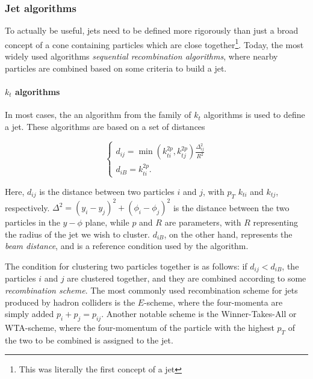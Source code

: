 \documentclass[10pt,a4paper]{book}
\begin{document}
\subsubsection{Jet algorithms}
To actually be useful, jets need to be defined more rigorously than just a broad concept of a cone containing particles which are close together\footnote{This was literally the first concept of a jet}. Today, the most widely used algorithms \emph{sequential recombination algorithms}, where nearby particles are combined based on some criteria to build a jet. 

\paragraph{$k_t$ algorithms}

In most cases, the an algorithm from the family of $k_t$ algorithms is used to define a jet. These algorithms are based on a set of distances

\begin{equation}
\begin{cases}
d_{ij} = \min(k_{ti}^{2p}, k_{tj}^{2p})\frac{\Delta_{ij}^2}{R^2} \\
d_{iB} = k_{ti}^{2p}.
\end{cases}
\end{equation}

Here, $d_{ij}$ is the distance between two particles $i$ and $j$, with $p_T$ $k_{ti}$ and $k_{tj}$, respectively. $\Delta^2 = (y_i - y_j)^2 + (\phi_i - \phi_j)^2$ is the distance between the two particles in the $y-\phi$ plane, while $p$ and $R$ are parameters, with $R$ representing the radius of the jet we wish to cluster. $d_{iB}$, on the other hand, represents the \emph{beam distance}, and is a reference condition used by the algorithm.

The condition for clustering two particles together is as follows: if $d_{ij} < d_{iB}$, the particles $i$ and $j$ are clustered together, and they are combined according to some \emph{recombination scheme}. The most commonly used recombination scheme for jets produced by hadron colliders is the $E$-scheme, where the four-momenta are simply added $p_i + p_j  = p_{ij}$. Another notable scheme is the Winner-Takes-All or WTA-scheme, where the four-momentum of the particle with the highest $p_T$ of the two to be combined is assigned to the jet. 
\end{document}
